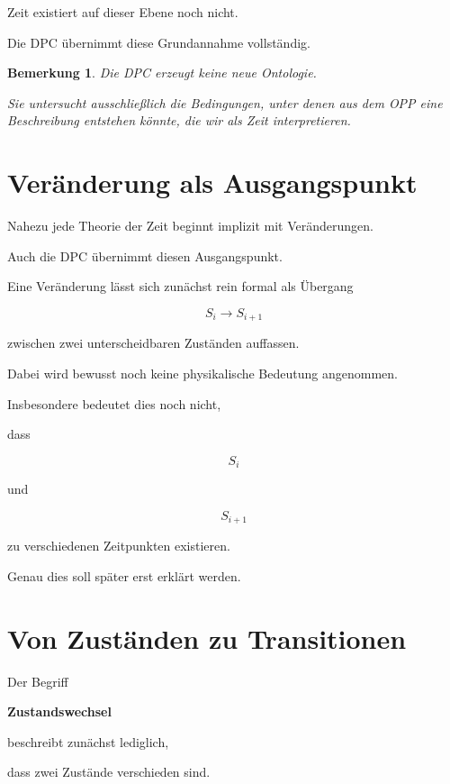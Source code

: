 \documentclass[11pt,a4paper]{article}
\newtheorem{remark}{Bemerkung}
\begin{document}
Zeit existiert auf dieser Ebene noch nicht.

Die DPC übernimmt diese Grundannahme vollständig.

\begin{remark}

Die DPC erzeugt keine neue Ontologie.

Sie untersucht ausschließlich die Bedingungen,
unter denen aus dem OPP eine Beschreibung entstehen
könnte, die wir als Zeit interpretieren.

\end{remark}

\section{Veränderung als Ausgangspunkt}

Nahezu jede Theorie der Zeit beginnt implizit mit
Veränderungen.

Auch die DPC übernimmt diesen Ausgangspunkt.

Eine Veränderung lässt sich zunächst rein formal als
Übergang

\[
S_i
\longrightarrow
S_{i+1}
\]

zwischen zwei unterscheidbaren Zuständen auffassen.

Dabei wird bewusst noch keine physikalische Bedeutung
angenommen.

Insbesondere bedeutet dies noch nicht,

dass

\[
S_i
\]

und

\[
S_{i+1}
\]

zu verschiedenen Zeitpunkten existieren.

Genau dies soll später erst erklärt werden.

\section{Von Zuständen zu Transitionen}

Der Begriff

\textbf{Zustandswechsel}

beschreibt zunächst lediglich,

dass zwei Zustände verschieden sind.
\end{document}
